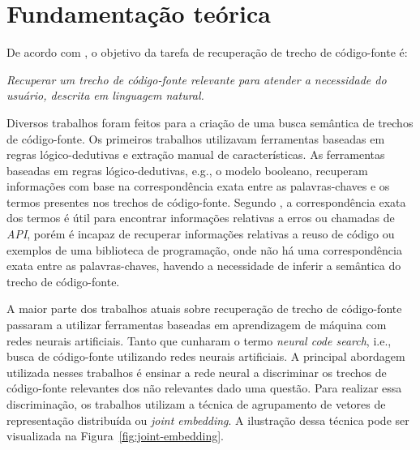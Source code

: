 \chapter{Fundamentação teórica}
\label{cap:fundamentacao-teorica}

De acordo com \cite{Chen-bi-variational-autoencoder:2018}, o objetivo da tarefa de recuperação de trecho de código-fonte é:

\emph{Recuperar um trecho de código-fonte relevante para atender a necessidade do usuário, descrita em linguagem natural.}

Diversos trabalhos foram feitos para a criação de uma busca semântica de trechos de código-fonte. Os primeiros trabalhos utilizavam ferramentas baseadas em regras lógico-dedutivas e extração manual de características. As ferramentas baseadas em regras lógico-dedutivas, e.g., o modelo booleano, recuperam informações com base na correspondência exata entre as palavras-chaves e os termos presentes nos trechos de código-fonte. Segundo \cite{yan-benchmark-code-search-information-retrieval-deep-learning:2020}, a correspondência exata dos termos é útil para encontrar informações relativas a erros ou chamadas de \textit{API}, porém é incapaz de recuperar informações relativas a reuso de código ou exemplos de uma biblioteca de programação, onde não há uma correspondência exata entre as palavras-chaves, havendo a necessidade de inferir a semântica do trecho de código-fonte.

A maior parte dos trabalhos atuais sobre recuperação de trecho de código-fonte passaram a utilizar ferramentas baseadas em aprendizagem de máquina com redes neurais artificiais. Tanto que \cite{cambronero-deep-learning-code-search:2019} cunharam o termo \textit{neural code search}, i.e., busca de código-fonte utilizando redes neurais artificiais. A principal abordagem utilizada nesses trabalhos é ensinar a rede neural a discriminar os trechos de código-fonte relevantes dos não relevantes dado uma questão. Para realizar essa discriminação, os trabalhos utilizam a técnica de agrupamento de vetores de representação distribuída ou \textit{joint embedding}. A ilustração dessa técnica pode ser visualizada na Figura~\ref{fig:joint-embedding}.

